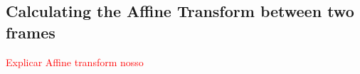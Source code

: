 \documentclass[]{IEEEtran}
\newcommand\todolist[1]{\textcolor{red}{#1}}
\begin{document}

\subsection{Calculating the Affine Transform between two frames}
\todolist{Explicar Affine transform nosso}

\end{document}
